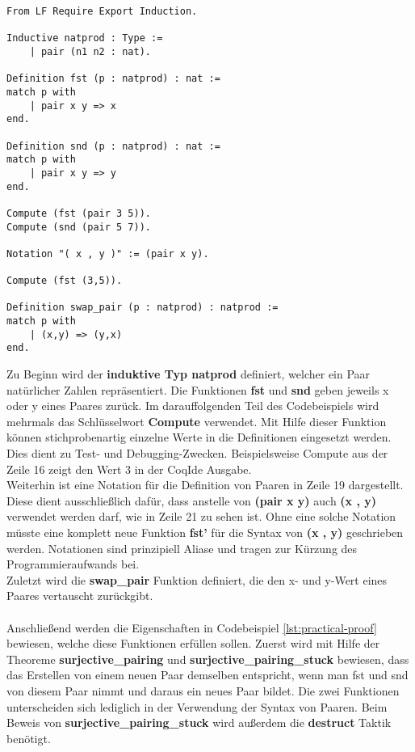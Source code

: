 \begin{lstlisting}[language=coq,firstnumber=1,caption=Coq Funktionen für Paare aus natürlichen Zahlen (PaperPair.v),label=lst:practical-functions]
From LF Require Export Induction.

Inductive natprod : Type :=
	| pair (n1 n2 : nat).

Definition fst (p : natprod) : nat :=
match p with
	| pair x y => x
end.

Definition snd (p : natprod) : nat :=
match p with
	| pair x y => y
end.

Compute (fst (pair 3 5)).
Compute (snd (pair 5 7)).

Notation "( x , y )" := (pair x y).

Compute (fst (3,5)).

Definition swap_pair (p : natprod) : natprod :=
match p with
	| (x,y) => (y,x)
end.
\end{lstlisting}
Zu Beginn wird der \textbf{induktive Typ natprod} definiert, welcher ein Paar natürlicher Zahlen repräsentiert. Die Funktionen \textbf{fst} und \textbf{snd} geben jeweils x oder y eines Paares zurück. Im darauffolgenden Teil des Codebeispiels wird mehrmals das Schlüsselwort \textbf{Compute} verwendet. Mit Hilfe dieser Funktion können stichprobenartig einzelne Werte in die Definitionen eingesetzt werden. Dies dient zu Test- und Debugging-Zwecken. Beispielsweise Compute aus der Zeile 16 zeigt den Wert 3 in der CoqIde Ausgabe.\\
Weiterhin ist eine Notation für die Definition von Paaren in Zeile 19 dargestellt. Diese dient ausschließlich dafür, dass anstelle von 
\textbf{(pair x y)} auch \textbf{(x , y)} verwendet werden darf, wie in Zeile 21 zu sehen ist. Ohne eine solche Notation müsste eine komplett neue Funktion \textbf{fst'} für die Syntax von \textbf{(x , y)} geschrieben werden. Notationen sind prinzipiell Aliase und tragen zur Kürzung des Programmieraufwands bei.\\
Zuletzt wird die \textbf{swap\_pair} Funktion definiert, die den x- und y-Wert eines Paares vertauscht zurückgibt.\\
\\
Anschließend werden die Eigenschaften in Codebeispiel \ref{lst:practical-proof} bewiesen, welche diese Funktionen erfüllen sollen.
Zuerst wird mit Hilfe der Theoreme \textbf{surjective\_pairing} und \textbf{surjective\_pairing\_stuck} bewiesen, dass das Erstellen von einem neuen Paar demselben entspricht, wenn man fst und snd von diesem Paar nimmt und daraus ein neues Paar bildet. Die zwei Funktionen unterscheiden sich lediglich in der Verwendung der Syntax von Paaren. Beim Beweis von \textbf{surjective\_pairing\_stuck} wird außerdem die \textbf{destruct} Taktik benötigt.\\
